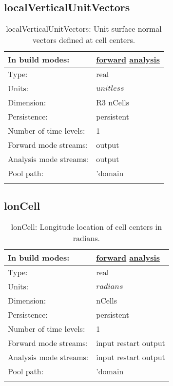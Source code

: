 \subsection[localVerticalUnitVectors]{localVerticalUnitVectors}
\label{subsec:var_sec_mesh_localVerticalUnitVectors}
\begin{center}
\begin{longtable}{| p{2.0in} | p{4.0in} |}
        \hline 
        In build modes: & \hyperref[subsec:forward_var_tab_mesh]{forward} \hyperref[subsec:analysis_var_tab_mesh]{analysis} \\
        \hline 
        Type: & real \\
        \hline 
        Units: & $unitless$ \\
        \hline 
        Dimension: & R3 nCells \\
        \hline 
        Persistence: & persistent \\
        \hline 
        Number of time levels: & 1 \\
        \hline 
		 Forward mode streams: &  output \\
        \hline 
		 Analysis mode streams: &  output \\
        \hline 
            Pool path: & 'domain %
 \\
		 \hline 
    \caption{localVerticalUnitVectors: Unit surface normal vectors defined at cell centers.}
\end{longtable}
\end{center}
\subsection[lonCell]{lonCell}
\label{subsec:var_sec_mesh_lonCell}
\begin{center}
\begin{longtable}{| p{2.0in} | p{4.0in} |}
        \hline 
        In build modes: & \hyperref[subsec:forward_var_tab_mesh]{forward} \hyperref[subsec:analysis_var_tab_mesh]{analysis} \\
        \hline 
        Type: & real \\
        \hline 
        Units: & $radians$ \\
        \hline 
        Dimension: & nCells \\
        \hline 
        Persistence: & persistent \\
        \hline 
        Number of time levels: & 1 \\
        \hline 
		 Forward mode streams: &  input restart output \\
        \hline 
		 Analysis mode streams: &  input restart output \\
        \hline 
            Pool path: & 'domain %
 \\
		 \hline 
    \caption{lonCell: Longitude location of cell centers in radians.}
\end{longtable}
\end{center}
